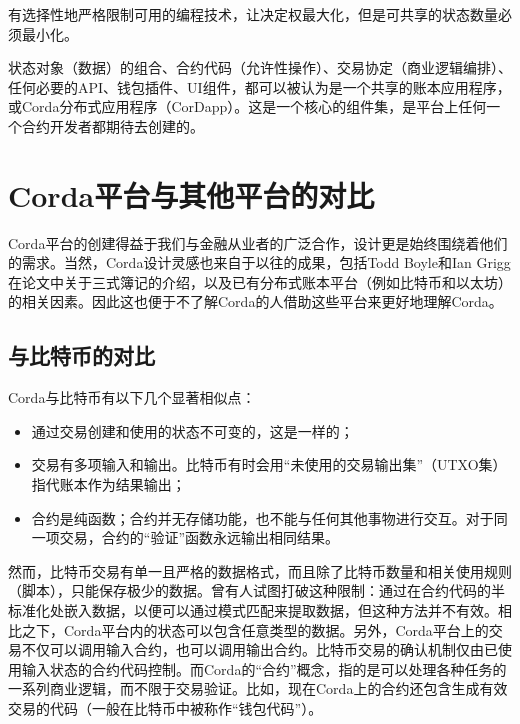 \documentclass[UTF8]{ctexart}
\begin{document}
有选择性地严格限制可用的编程技术，让决定权最大化，但是可共享的状态数量必须最小化。

状态对象（数据）的组合、合约代码（允许性操作）、交易协定（商业逻辑编排）、任何必要的API、钱包插件、UI组件，都可以被认为是一个共享的账本应用程序，或Corda分布式应用程序（CorDapp）。这是一个核心的组件集，是平台上任何一个合约开发者都期待去创建的。 



\section{Corda平台与其他平台的对比}
Corda平台的创建得益于我们与金融从业者的广泛合作，设计更是始终围绕着他们的需求。当然，Corda设计灵感也来自于以往的成果，包括Todd Boyle和Ian Grigg在论文中关于三式簿记\cite{Triple}的介绍，以及已有分布式账本平台（例如比特币\cite{Bitcoin}和以太坊）的相关因素。因此这也便于不了解Corda的人借助这些平台来更好地理解Corda。
\subsection{与比特币的对比}
Corda与比特币有以下几个显著相似点： 
\begin{itemize}
\item  通过交易创建和使用的状态不可变的，这是一样的；
\item 交易有多项输入和输出。比特币有时会用“未使用的交易输出集”（UTXO集）指代账本作为结果输出；
\item 合约是纯函数；合约并无存储功能，也不能与任何其他事物进行交互。对于同一项交易，合约的“验证”函数永远输出相同结果。
\end{itemize}

然而，比特币交易有单一且严格的数据格式，而且除了比特币数量和相关使用规则（脚本），只能保存极少的数据。曾有人试图打破这种限制：通过在合约代码的半标准化处嵌入数据，以便可以通过模式匹配来提取数据，但这种方法并不有效。相比之下，Corda平台内的状态可以包含任意类型的数据。另外，Corda平台上的交易不仅可以调用输入合约，也可以调用输出合约。比特币交易的确认机制仅由已使用输入状态的合约代码控制。而Corda的“合约”概念，指的是可以处理各种任务的一系列商业逻辑，而不限于交易验证。比如，现在Corda上的合约还包含生成有效交易的代码（一般在比特币中被称作“钱包代码”）。
\end{document}
